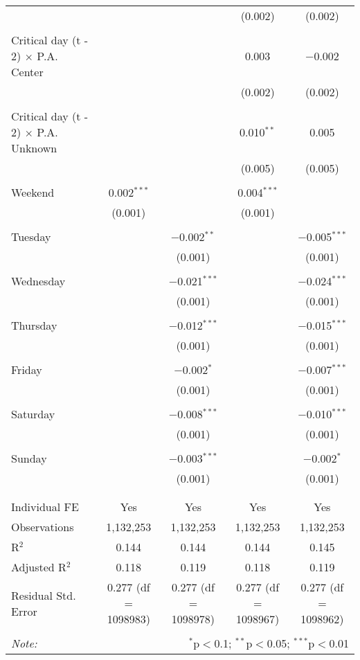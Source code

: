\documentclass[
]{article}
\begin{document}
\begin{table}[!htbp]
{\begin{tabular}{@{\extracolsep{5pt}}lcccc}
  &  &  & (0.002) & (0.002) \\ 
  & & & & \\ 
 Critical day (t - 2) $\times$ P.A. Center &  &  & 0.003 & $-$0.002 \\ 
  &  &  & (0.002) & (0.002) \\ 
  & & & & \\ 
 Critical day (t - 2) $\times$ P.A. Unknown &  &  & 0.010$^{**}$ & 0.005 \\ 
  &  &  & (0.005) & (0.005) \\ 
  & & & & \\ 
 Weekend & 0.002$^{***}$ &  & 0.004$^{***}$ &  \\ 
  & (0.001) &  & (0.001) &  \\ 
  & & & & \\ 
 Tuesday &  & $-$0.002$^{**}$ &  & $-$0.005$^{***}$ \\ 
  &  & (0.001) &  & (0.001) \\ 
  & & & & \\ 
 Wednesday &  & $-$0.021$^{***}$ &  & $-$0.024$^{***}$ \\ 
  &  & (0.001) &  & (0.001) \\ 
  & & & & \\ 
 Thursday &  & $-$0.012$^{***}$ &  & $-$0.015$^{***}$ \\ 
  &  & (0.001) &  & (0.001) \\ 
  & & & & \\ 
 Friday &  & $-$0.002$^{*}$ &  & $-$0.007$^{***}$ \\ 
  &  & (0.001) &  & (0.001) \\ 
  & & & & \\ 
 Saturday &  & $-$0.008$^{***}$ &  & $-$0.010$^{***}$ \\ 
  &  & (0.001) &  & (0.001) \\ 
  & & & & \\ 
 Sunday &  & $-$0.003$^{***}$ &  & $-$0.002$^{*}$ \\ 
  &  & (0.001) &  & (0.001) \\ 
  & & & & \\ 
\hline \\[-1.8ex] 
Individual FE & Yes & Yes & Yes & Yes \\ 
Observations & 1,132,253 & 1,132,253 & 1,132,253 & 1,132,253 \\ 
R$^{2}$ & 0.144 & 0.144 & 0.144 & 0.145 \\ 
Adjusted R$^{2}$ & 0.118 & 0.119 & 0.118 & 0.119 \\ 
Residual Std. Error & 0.277 (df = 1098983) & 0.277 (df = 1098978) & 0.277 (df = 1098967) & 0.277 (df = 1098962) \\ 
\hline 
\hline \\[-1.8ex] 
\textit{Note:}  & \multicolumn{4}{r}{$^{*}$p$<$0.1; $^{**}$p$<$0.05; $^{***}$p$<$0.01} \\ 
\end{tabular}
} 
\end{table}
\end{document}
